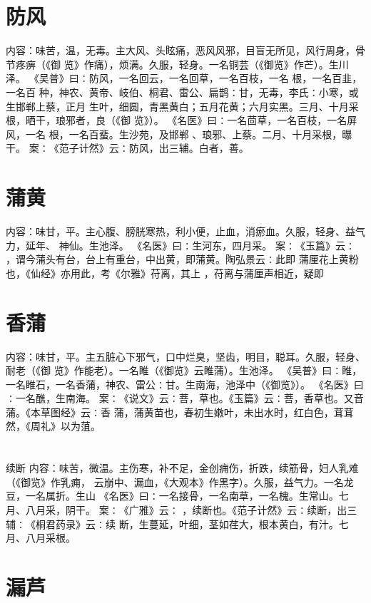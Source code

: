 \documentclass[12pt,UTF8]{ctexbook}
\begin{document}
\section{防风}
内容：味苦，温，无毒。主大风、头眩痛，恶风风邪，目盲无所见，风行周身，骨节疼痹（《御 
览》作痛），烦满。久服，轻身。一名铜芸（《御览》作芒）。生川泽。 
《吴普》曰∶防风，一名回云，一名回草，一名百枝，一名 根，一名百韭，一名百 
种，神农、黄帝、岐伯、桐君、雷公、扁鹊∶甘，无毒，李氏∶小寒，或生邯郸上蔡，正月 
生叶，细圆，青黑黄白；五月花黄；六月实黑。三月、十月采根，晒干，琅邪者，良（《御 
览》）。 
《名医》曰∶一名茴草，一名百枝，一名屏风，一名 根，一名百蜚。生沙苑，及邯郸 
、琅邪、上蔡。二月、十月采根，曝干。 
案∶《范子计然》云∶防风，出三辅。白者，善。 


\section{蒲黄}
内容：味甘，平。主心腹、膀胱寒热，利小便，止血，消瘀血。久服，轻身、益气力，延年、 
神仙。生池泽。 
《名医》曰∶生河东，四月采。 
案∶《玉篇》云∶ ，谓今蒲头有台，台上有重台，中出黄，即蒲黄。陶弘景云∶此即 
蒲厘花上黄粉也，《仙经》亦用此，考《尔雅》苻离，其上 ，苻离与蒲厘声相近，疑即 


\section{香蒲}
内容：味甘，平。主五脏心下邪气，口中烂臭，坚齿，明目，聪耳。久服，轻身、耐老（《御 
览》作能老）。一名睢（《御览》云睢蒲）。生池泽。 
《吴普》曰∶睢，一名睢石，一名香蒲，神农、雷公∶甘。生南海，池泽中（《御览》）。 
《名医》曰∶一名醮，生南海。 
案∶《说文》云∶菩，草也。《玉篇》云∶菩，香草也。又音蒲。《本草图经》云∶香 
蒲，蒲黄苗也，春初生嫩叶，未出水时，红白色，茸茸然，《周礼》以为菹。 


\section{}续断
内容：味苦，微温。主伤寒，补不足，金创痈伤，折跌，续筋骨，妇人乳难（《御览》作乳痈， 
云崩中、漏血，《大观本》作黑字）。久服，益气力。一名龙豆，一名属折。生山 
《名医》曰∶一名接骨，一名南草，一名槐。生常山。七月、八月采，阴干。 
案∶《广雅》云∶ ，续断也。《范子计然》云∶续断，出三辅∶《桐君药录》云∶续 
断，生蔓延，叶细，茎如荏大，根本黄白，有汁。七月、八月采根。 


\section{漏芦}
\end{document}

